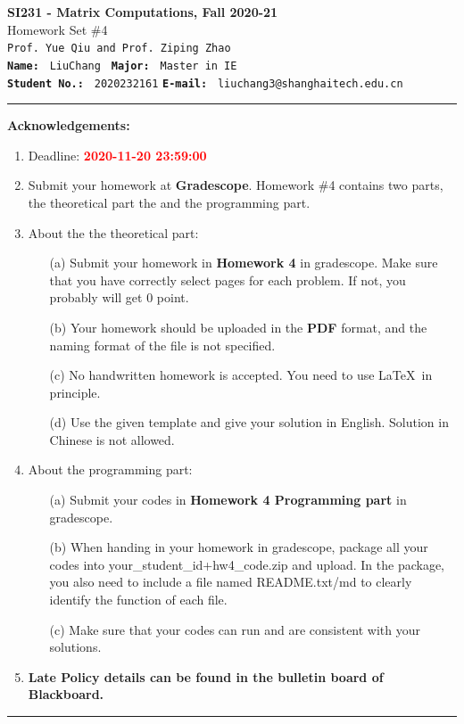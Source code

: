 \documentclass[english,onecolumn]{IEEEtran}
\begin{document}
\begin{center}
	\textbf{\LARGE{SI231 - Matrix Computations, Fall 2020-21}}\\
	{\Large Homework Set \#4}\\
	\texttt{Prof. Yue Qiu and Prof. Ziping Zhao}\\
	\texttt{\textbf{Name:}}   	\texttt{ LiuChang }  		\hspace{1bp}
	\texttt{\textbf{Major:}}  	\texttt{ Master in IE } 	\\
	\texttt{\textbf{Student No.:}} 	\texttt{ 2020232161}     \hspace{1bp}
	\texttt{\textbf{E-mail:}} 	\texttt{ liuchang3@shanghaitech.edu.cn}
\par\end{center}

\noindent
\rule{\linewidth}{0.4pt}
{\bf {\large Acknowledgements:}}
\begin{enumerate}
    \item Deadline: \textcolor{red}{\textbf{2020-11-20 23:59:00}}
    \item Submit your homework at \textbf{Gradescope}.
    Homework \#4 contains two parts, the theoretical part the and the programming part.
    \item About the the theoretical part:
    \begin{enumerate}
            \item[(a)] Submit your homework in \textbf{Homework 4} in gradescope. Make sure that you have correctly select pages for each problem. If not, you probably will get 0 point.
            \item[(b)] Your homework should be uploaded in the \textbf{PDF} format, and the naming format of the file is not specified.
            \item[(c)] No handwritten homework is accepted. You need to use \LaTeX $\,$ in principle.
            \item[(d)] Use the given template and give your solution in English. Solution in Chinese is not allowed. 
        \end{enumerate}
  \item About the programming part:
  \begin{enumerate}
      \item[(a)] Submit your codes in \textbf{Homework 4 Programming part} in gradescope. 
      \item[(b)] When handing in your homework in gradescope, package all your codes into {\sf your\_student\_id+hw4\_code.zip} and upload. In the package, you also need to include a file named {\sf README.txt/md} to clearly identify the function of each file.
     \item[(c)] Make sure that your codes can run and are consistent with your solutions.
  \end{enumerate}
  \item \textbf{Late Policy details can be found in the bulletin board of Blackboard.}
\end{enumerate}
\rule{\linewidth}{0.4pt}
\end{document}
